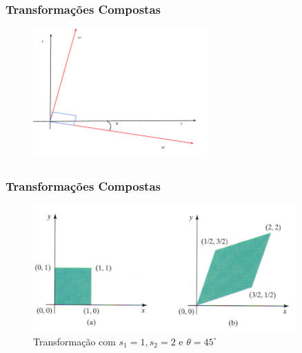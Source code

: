 \documentclass{beamer}
\begin{document}
\begin{frame}
\frametitle{Transformações Compostas}

	\begin{figure}[!h]
		\begin{center}
			\includegraphics[width=0.6\textwidth]{Figures/escalaGeral}
		\end{center}
	\end{figure}
		
\end{frame}	

\begin{frame}
\frametitle{Transformações Compostas}

	\begin{figure}[!h]
		\begin{center}
			\includegraphics[width=0.9\textwidth]{Figures/EscalaGeralEx}
			\caption{Transformação com $s_1=1,s_2=2$ e $\theta = 45^{\circ}$}
		\end{center}
	\end{figure}
		
\end{frame}	

\end{document}
